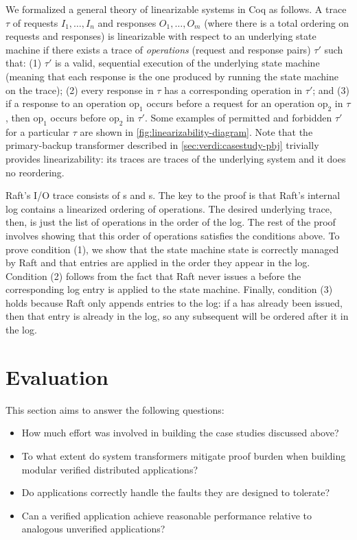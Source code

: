 We formalized a general theory of linearizable systems in Coq as
follows. A trace $\tau$ of requests $I_1,\dots,I_n$ and responses
$O_1,\dots,O_m$ (where there is a total ordering on requests and
responses) is linearizable with respect to an underlying state machine
if there exists a trace of \textit{operations} (\ie request and
response pairs) $\tau'$ such that: (1) $\tau'$ is a valid, sequential
execution of the underlying state machine (meaning that each response
is the one produced by running the state machine on the trace); (2)
every response in $\tau$ has a corresponding operation in $\tau'$; and
(3) if a response to an operation $\mathrm{op}_1$ occurs before a
request for an operation $\mathrm{op}_2$ in $\tau$, then
$\mathrm{op}_1$ occurs before $\mathrm{op}_2$ in $\tau'$. Some
examples of permitted and forbidden $\tau'$ for a particular $\tau$
are shown in \cref{fig:linearizability-diagram}. Note that the
primary-backup transformer described in \cref{sec:verdi:casestudy-pbj}
trivially provides linearizability: its traces are traces of the
underlying system and it does no reordering.

Raft's I/O trace consists of s and
s. The key to the proof is that Raft's internal
log contains a linearized ordering of operations. The desired
underlying trace, then, is just the list of operations in the order of
the log. The rest of the proof involves showing that this order of
operations satisfies the conditions above. To prove condition (1), we
show that the state machine state is correctly managed by Raft and
that entries are applied in the order they appear in the
log. Condition (2) follows from the fact that Raft never issues a
 before the corresponding log entry is applied to
the state machine. Finally, condition (3) holds because Raft only
appends entries to the log: if a  has already
been issued, then that entry is already in the log, so any subsequent
 will be ordered after it in the log.

\section{Evaluation}
\label{sec:verdi:eval}

This section aims to answer the following questions:
\begin{itemize}%
\item How much effort was involved in building the case studies discussed above?
\item To what extent do system transformers mitigate proof burden when
  building modular verified distributed applications?
\item Do \Verdi applications correctly handle the faults they are designed to tolerate?
\item Can a verified \Verdi application achieve reasonable performance
  relative to analogous unverified applications?
\end{itemize}


